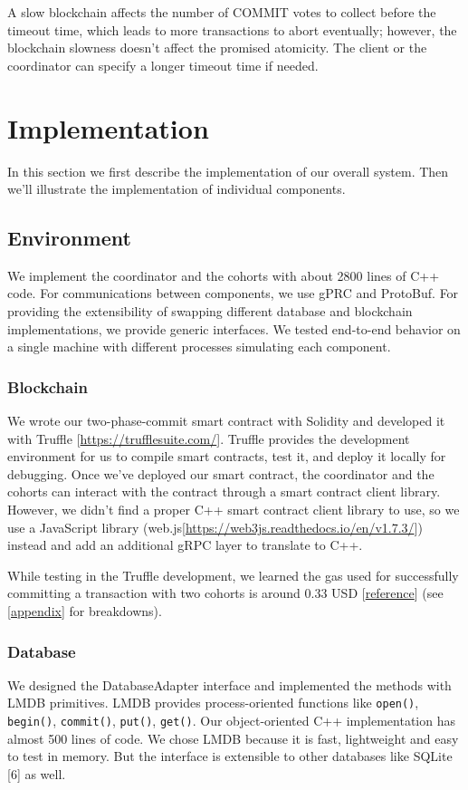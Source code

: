 \documentclass[11pt,conference]{IEEEtran}
\begin{document}
A slow blockchain affects the number of COMMIT votes to collect before the timeout time, which leads to more transactions to abort eventually; however, the blockchain slowness doesn’t affect the promised atomicity. The client or the coordinator can specify a longer timeout time if needed.


\section{Implementation}
In this section we first describe the implementation of our overall system. Then we’ll illustrate the implementation of individual components.

\subsection{Environment}
We implement the coordinator and the cohorts with about 2800 lines of C++ code. For communications between components, we use gPRC and ProtoBuf. For providing the extensibility of swapping different database and blockchain implementations, we provide generic interfaces. We tested end-to-end behavior on a single machine with different processes simulating each component.

\subsubsection{Blockchain}
We wrote our two-phase-commit smart contract with Solidity and developed it with Truffle [\url{https://trufflesuite.com/}]. Truffle provides the development environment for us to compile smart contracts, test it, and deploy it locally for debugging. Once we’ve deployed our smart contract, the coordinator and the cohorts can interact with the contract through a smart contract client library. However, we didn’t find a proper C++ smart contract client library to use, so we use a JavaScript library (web.js[\url{https://web3js.readthedocs.io/en/v1.7.3/}]) instead and add an additional gRPC layer to translate to C++.

While testing in the Truffle development, we learned the gas used for successfully committing a transaction with two cohorts is around 0.33 USD [\href{https://automatedwebtools.com/gwei-to-usd-calculator/}{reference}] (see \ref{appendix} for breakdowns).

\subsubsection{Database}
We designed the DatabaseAdapter interface and implemented the methods with LMDB primitives. LMDB provides process-oriented functions like \texttt{open()}, \texttt{begin()}, \texttt{commit()}, \texttt{put()}, \texttt{get()}. Our object-oriented C++ implementation has almost 500 lines of code. We chose LMDB because it is fast, lightweight and easy to test in memory. But the interface is extensible to other databases like SQLite [6] as well.
\end{document}
